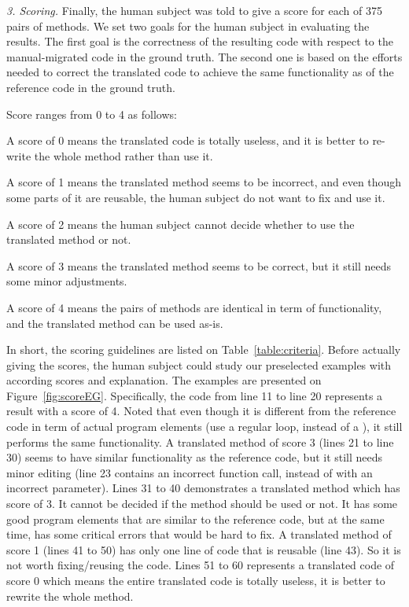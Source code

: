 \emph{3. Scoring.} Finally, the human subject was told to give a score
for each of 375 pairs of methods. We set two goals for the human
subject in evaluating the results. The first goal is the correctness of
the resulting code with respect to the manual-migrated code in the
ground truth. The second one is based on the efforts needed to correct
the translated code to achieve the same functionality as of the
reference code in the ground truth.
%

Score ranges from 0 to 4 as follows:

\begin{compactitem}

\item A score of 0 means the translated code is totally useless, and
  it is better to re-write the whole method rather than use it.

\item A score of 1 means the translated method seems to be incorrect, and even
though some parts of it are reusable, the human subject do not want to
fix and use it.

\item A score of 2 means the human subject cannot decide whether to
  use the translated method or not.

\item A score of 3 means the translated method seems to be correct,
  but it still needs some minor adjustments.

\item A score of 4 means the pairs of methods are identical in term of
functionality, and the translated method can be used as-is.

\end{compactitem}

In short, the scoring guidelines are listed on
Table~\ref{table:criteria}. Before actually giving the scores, the
human subject could study our preselected examples with according
scores and explanation. The examples are presented on
Figure~\ref{fig:scoreEG}. Specifically, the code from line 11 to line
20 represents a result with a score of 4. Noted that even though it is
different from the reference code in term of actual program elements
(use a regular  loop, instead of a ), it still
performs the same functionality. A translated method of score 3 (lines
21 to line 30) seems to have similar functionality as the reference
code, but it still needs minor editing (line 23 contains an incorrect
function call,  instead of  with an
incorrect parameter). Lines 31 to 40 demonstrates a translated method
which has score of 3. It cannot be decided if the method should be
used or not. It has some good program elements that are similar to the
reference code, but at the same time, has some critical errors that
would be hard to fix. A translated method of score 1 (lines 41 to 50)
has only one line of code that is reusable (line 43). So it is not
worth fixing/reusing the code. Lines 51 to 60 represents a translated
code of score 0 which means the entire translated code is totally
useless, \ie it is better to rewrite the whole method.


